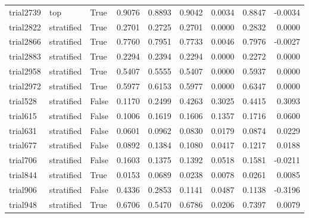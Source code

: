 \begin{tabular}{lllrrrrrr}
trial2739 &        top &         True &  0.9076 &     0.8893 &  0.9042 &     0.0034 &   0.8847 &   -0.0034 \\
trial2822 & stratified &         True &  0.2701 &     0.2725 &  0.2701 &     0.0000 &   0.2832 &    0.0000 \\
trial2866 & stratified &         True &  0.7760 &     0.7951 &  0.7733 &     0.0046 &   0.7976 &   -0.0027 \\
trial2883 & stratified &         True &  0.2294 &     0.2394 &  0.2294 &     0.0000 &   0.2272 &    0.0000 \\
trial2958 & stratified &         True &  0.5407 &     0.5555 &  0.5407 &     0.0000 &   0.5937 &    0.0000 \\
trial2972 & stratified &         True &  0.5977 &     0.6153 &  0.5977 &     0.0000 &   0.6347 &    0.0000 \\
 trial528 & stratified &        False &  0.1170 &     0.2499 &  0.4263 &     0.3025 &   0.4415 &    0.3093 \\
 trial615 & stratified &        False &  0.1006 &     0.1619 &  0.1606 &     0.1357 &   0.1716 &    0.0600 \\
 trial631 & stratified &        False &  0.0601 &     0.0962 &  0.0830 &     0.0179 &   0.0874 &    0.0229 \\
 trial677 & stratified &        False &  0.0892 &     0.1384 &  0.1080 &     0.0417 &   0.1217 &    0.0188 \\
 trial706 & stratified &        False &  0.1603 &     0.1375 &  0.1392 &     0.0518 &   0.1581 &   -0.0211 \\
 trial844 & stratified &         True &  0.0153 &     0.0689 &  0.0238 &     0.0078 &   0.0261 &    0.0085 \\
 trial906 & stratified &        False &  0.4336 &     0.2853 &  0.1141 &     0.0487 &   0.1138 &   -0.3196 \\
 trial948 & stratified &         True &  0.6706 &     0.5470 &  0.6786 &     0.0206 &   0.7397 &    0.0079 \\
\bottomrule
\end{tabular}

